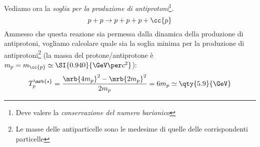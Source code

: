 \begin{example}
  Vediamo ora la \textit{soglia per la produzione di antiprotoni}\footnote{
    Deve valere la \textit{conservazione del numero barionico}
  }.
	\begin{equation}
		p + p \rightarrow p + p + p + \cc{p}
	\end{equation}
	Ammesso che questa reazione sia permessa dalla dinamica della produzione di
	antiprotoni, vogliamo calcolare quale sia la soglia minima per la produzione
	di antiprotoni\footnote{
		Le masse delle antiparticelle sono le medesime di quelle delle
		corrispondenti particelle
	} (la massa del protone/antiprotone è $m _{p} = m _{\cc{p}} \simeq
	\SI{0.940}{\GeV \per c^2}$):
	\begin{equation}
		T _{p} ^{\mrb{s}} = \frac{\mrb{4 m_p}^{2} - \mrb{2 m_p}^{2}}{2 m_p} = 6 m_p
		\simeq \qty{5.9}{\GeV}
	\end{equation}
\end{example}

